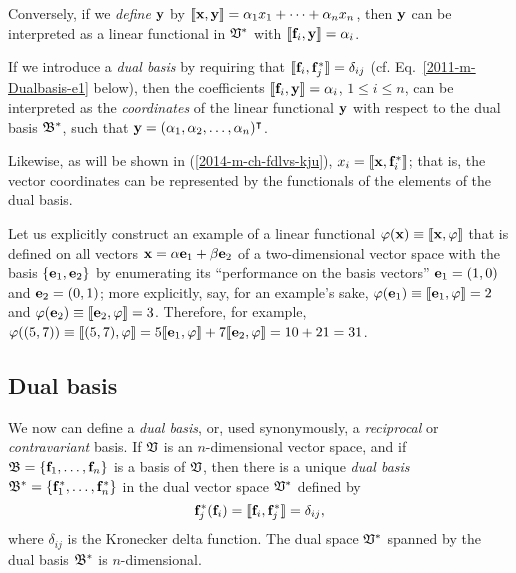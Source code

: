 Conversely, if we {\em define} ${\bf y}$ by $\llbracket {\bf x},{\bf y}\rrbracket  =\alpha_1  x_1+ \cdots +\alpha_n x_n$, then ${\bf y}$
can be interpreted as a linear functional in ${\frak V}^\ast$ with $\llbracket {\bf f}_i,{\bf y}\rrbracket  = \alpha_i$.

If we introduce a {\em dual basis}
by requiring that $\llbracket {\bf f}_i,  {\bf f}_j^\ast \rrbracket =\delta_{ij}$ (cf. Eq.~\ref{2011-m-Dualbasis-e1} below),
then the coefficients $\llbracket {\bf f}_i ,{\bf y}\rrbracket  = \alpha_i$,
$1\le i \le n$, can be interpreted
as the {\em coordinates} of the linear functional ${\bf y}$ with respect to the dual
basis ${\frak B}^\ast$, such that ${\bf y}=(\alpha_1,\alpha_2,\ldots , \alpha_n)^\intercal $.

Likewise, as will be shown in (\ref{2014-m-ch-fdlvs-kju}),
$
x_i =
 \llbracket {\bf x},{\bf f}_i^\ast \rrbracket
$; that is, the vector coordinates can be represented by the functionals of the elements of the dual basis.


{\color{blue}
\bexample
Let us explicitly construct an example of a linear functional $\varphi ({\bf x})\equiv \llbracket {\bf x},\varphi\rrbracket $ that is defined
on all vectors ${\bf x}=
\alpha {\bf e}_1
+
\beta {\bf e}_2
$
of a two-dimensional vector space with the basis $\{{\bf e}_1, {\bf e}_2 \}$
by enumerating its ``performance on the basis vectors''  ${\bf e}_1=(1,0)$ and ${\bf e}_2=(0,1)$;
more explicitly,  say, for an example's sake,
$\varphi ({\bf e}_1 ) \equiv \llbracket  {\bf e}_1,\varphi \rrbracket  = 2$ and
$\varphi ({\bf e}_2 ) \equiv \llbracket  {\bf e}_2,\varphi \rrbracket  = 3$.
Therefore, for example,
$\varphi ((5,7) ) \equiv \llbracket (5,7), \varphi \rrbracket  = 5 \llbracket {\bf e}_1, \varphi \rrbracket  + 7 \llbracket  {\bf e}_2,\varphi \rrbracket
=10+21=31$.
\eexample
}

\subsection{Dual basis}
\label{2011-m-Dualbasis}

We now can define a {\em dual basis}, or, used synonymously, a {\em reciprocal} or {\em contravariant} basis.
If ${\frak V}$ is an $n$-dimensional vector space, and if
${\frak B} = \{{\bf f}_1,\ldots , {\bf f}_n\}$
is a basis of  ${\frak V}$,
then there is a unique {\em dual basis}
${\frak B}^\ast
=\{{\bf f}_1^\ast ,\ldots , {\bf f}_n^\ast \}$ in the dual vector space ${\frak V}^\ast $
defined by
\begin{equation}
{\bf f}_j^\ast ({\bf f}_i) =  \llbracket {\bf f}_i,  {\bf f}_j^\ast \rrbracket =\delta_{ij},
\label{2011-m-Dualbasis-e1}
\end{equation}
where  $\delta_{ij}$
is the Kronecker delta function.
The dual space  ${\frak V}^\ast $ spanned by the dual basis ${\frak B}^\ast $ is $n$-dimensional.

